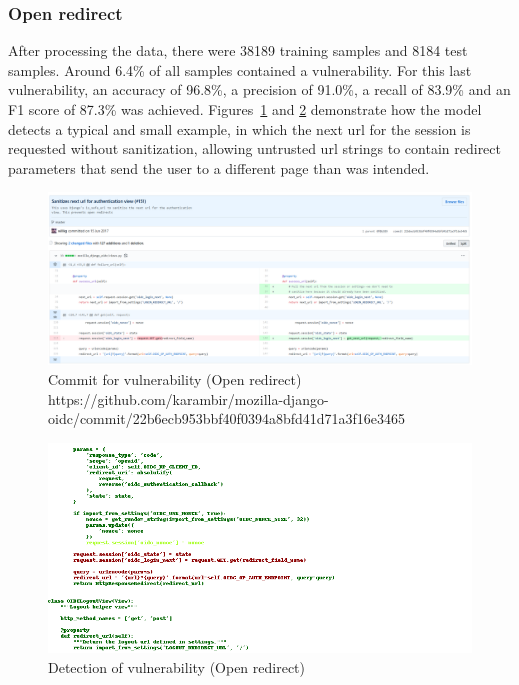 \documentclass[
a4paper,
pagesize,
pdftex,
12pt,
ngerman,
fleqn,
final,
]{scrartcl}
\begin{document}
	
	\newpage
	
	\subsubsection{Open redirect}
	After processing the data, there were 38189 training samples and 8184 test samples. Around 6.4\% of all samples contained a vulnerability. For this last vulnerability, an accuracy of 96.8\%, a precision of 91.0\%, a recall of 83.9\% and an F1 score of 87.3\% was achieved. Figures~\ref{fig:open_redirectA} and \ref{fig:open_redirectAr} demonstrate how the model detects a typical and small example, in which the next url for the session is requested without sanitization, allowing untrusted url strings to contain redirect parameters that send the user to a different page than was intended. 
		
	\begin{figure}[H]
		\centering
		\includegraphics[width=\linewidth]{Images/open_redirectA}
		\caption{Commit for vulnerability (Open redirect) \newline \scriptsize{
				https://github.com/karambir/mozilla-django-oidc/commit/22b6ecb953bbf40f0394a8bfd41d71a3f16e3465}}
		\label{fig:open_redirectA}
	\end{figure}
	\begin{figure}[H]
		\centering
		\includegraphics[width=\linewidth]{Images/open_redirectAr}
		\caption{Detection of vulnerability (Open redirect)}
		\label{fig:open_redirectAr}
	\end{figure}
	\newpage
\end{document}
